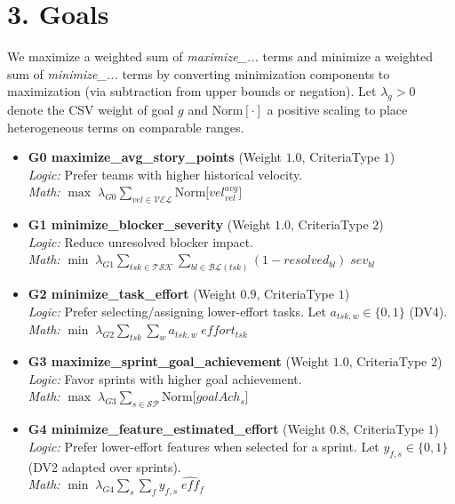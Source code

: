 \documentclass[11pt,a4paper]{article}
\begin{document}
\section{3. Goals}
We maximize a weighted sum of \emph{maximize\_...} terms and minimize a weighted sum of \emph{minimize\_...} terms by converting minimization components to maximization (via subtraction from upper bounds or negation). Let $\lambda_g>0$ denote the CSV weight of goal $g$ and $\mathrm{Norm}[\cdot]$ a positive scaling to place heterogeneous terms on comparable ranges.

\begin{itemize}[leftmargin=2em]

  \item \textbf{G0 \; maximize\_avg\_story\_points} (Weight $1.0$, CriteriaType $1$)\\
  \emph{Logic:} Prefer teams with higher historical velocity.\\
  \emph{Math:} $\displaystyle \max \; \lambda_{G0}\sum_{vel\in\mathcal{V\!E\!L}}\mathrm{Norm}\big[vel^{avg}_{vel}\big]$

  \item \textbf{G1 \; minimize\_blocker\_severity} (Weight $1.0$, CriteriaType $2$)\\
  \emph{Logic:} Reduce unresolved blocker impact.\\
  \emph{Math:} $\displaystyle \min \; \lambda_{G1}\sum_{tsk\in\mathcal{T\!S\!K}}\sum_{bl\in\mathcal{B\!L}(tsk)}(1-resolved_{bl})\;sev_{bl}$

  \item \textbf{G2 \; minimize\_task\_effort} (Weight $0.9$, CriteriaType $1$)\\
  \emph{Logic:} Prefer selecting/assigning lower-effort tasks. Let $a_{tsk,w}\in\{0,1\}$ (DV4).\\
  \emph{Math:} $\displaystyle \min \; \lambda_{G2}\sum_{tsk}\sum_{w} a_{tsk,w}\;effort_{tsk}$

  \item \textbf{G3 \; maximize\_sprint\_goal\_achievement} (Weight $1.0$, CriteriaType $2$)\\
  \emph{Logic:} Favor sprints with higher goal achievement.\\
  \emph{Math:} $\displaystyle \max \; \lambda_{G3}\sum_{s\in\mathcal{S\!P}}\mathrm{Norm}\big[goalAch_s\big]$

  \item \textbf{G4 \; minimize\_feature\_estimated\_effort} (Weight $0.8$, CriteriaType $1$)\\
  \emph{Logic:} Prefer lower-effort features when selected for a sprint. Let $y_{f,s}\in\{0,1\}$ (DV2 adapted over sprints).\\
  \emph{Math:} $\displaystyle \min \; \lambda_{G4}\sum_{s}\sum_{f} y_{f,s}\;\widehat{eff}_f$


\end{itemize}
\end{document}

